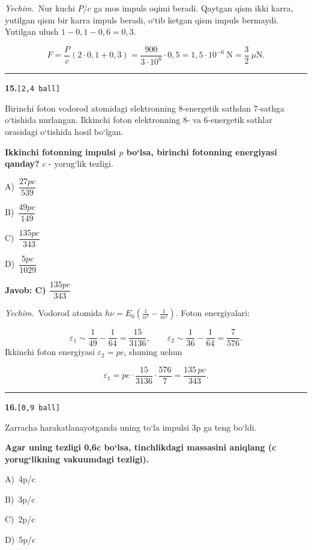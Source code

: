 \documentclass[11pt,a4paper]{article}
\newcommand{\ball}[1]{\hfill\texttt{[#1 ball]}}
\newcommand{\qhead}[2]{\Needspace{10\baselineskip}\noindent\textbf{#1.}\ball{#2}\par\nopagebreak}
\newcommand{\opt}[2]{\hspace*{8mm}#1)\ #2\par}
\newenvironment{qbody}{\begin{list}{}{\leftmargin=8mm\rightmargin=0pt\topsep=0pt\itemsep=0pt\parsep=3pt}\item\relax}{\end{list}}
\begin{document}
\noindent\textit{Yechim.}\ Nur kuchi $P/c$ ga mos impuls oqimi beradi. Qaytgan qism ikki karra, yutilgan qism bir karra impuls beradi, o‘tib ketgan qism impuls bermaydi. Yutilgan ulush $1-0{,}1-0{,}6=0{,}3$.\par
\[F=\frac{P}{c}\left(2\cdot0{,}1+0{,}3\right)=\frac{900}{3\cdot10^8}\cdot0{,}5=1{,}5\cdot10^{-6}\ \text{N}=\frac32\ \mu\text{N}.\]\par\medskip\hrule\medskip
\noindent\begin{minipage}{\linewidth}
\qhead{15}{2,4}
\begin{qbody}
Birinchi foton vodorod atomidagi elektronning 8-energetik sathdan 7-sathga o‘tishida nurlangan. Ikkinchi foton elektronning 8- va 6-energetik sathlar orasidagi o‘tishida hosil bo‘lgan.\par
\textbf{Ikkinchi fotonning impulsi $p$ bo‘lsa, birinchi fotonning energiyasi qanday?} $c$ - yorug‘lik tezligi.\par
\smallskip
\opt{A}{$\dfrac{27pc}{539}$}
\opt{B}{$\dfrac{49pc}{149}$}
\opt{C}{$\dfrac{135pc}{343}$}
\opt{D}{$\dfrac{5pc}{1029}$}
\end{qbody}\end{minipage}\par\vspace{2pt}
\noindent\colorbox{gray!12}{\parbox{\dimexpr\linewidth-2\fboxsep}{\textbf{Javob: C) $\dfrac{135pc}{343}$}}}\par\smallskip
\noindent\textit{Yechim.}\ Vodorod atomida $h\nu=E_0\left(\frac{1}{n^2}-\frac{1}{m^2}\right)$. Foton energiyalari:\par
\[\varepsilon_1\sim\frac{1}{49}-\frac{1}{64}=\frac{15}{3136},\qquad \varepsilon_2\sim\frac{1}{36}-\frac{1}{64}=\frac{7}{576}.\]
Ikkinchi foton energiyasi $\varepsilon_2=pc$, shuning uchun\par
\[\varepsilon_1=pc\cdot\frac{15}{3136}\cdot\frac{576}{7}=\frac{135\,pc}{343}.\]\par\medskip\hrule\medskip
\noindent\begin{minipage}{\linewidth}
\qhead{16}{0,9}
\begin{qbody}
Zarracha harakatlanayotganda uning to‘la impulsi 3p ga teng bo‘ldi.\par
\textbf{Agar uning tezligi 0,6c bo‘lsa, tinchlikdagi massasini aniqlang (c yorug‘likning vakuumdagi tezligi).}\par
\smallskip
\opt{A}{4p/c}
\opt{B}{3p/c}
\opt{C}{2p/c}
\opt{D}{5p/c}
\end{qbody}\end{minipage}\par\vspace{2pt}
\end{document}
